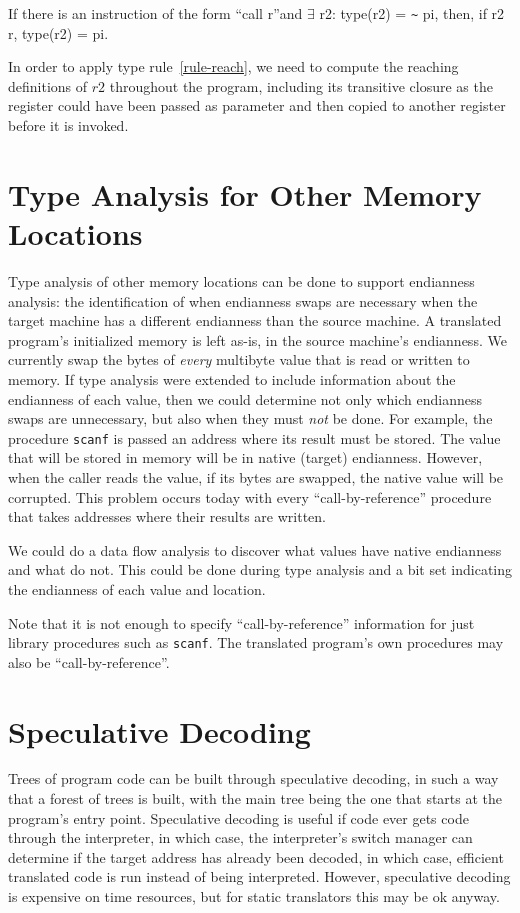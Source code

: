 \begin{typerule}
If there is an instruction of the form ``call r''and $\exists$ r2: 
type(r2) = \verb!~! pi, then, if r2 \ra* r, type(r2) = pi. 
\label{rule-reach}
\end{typerule}

In order to apply type rule~\ref{rule-reach}, we need to compute
the reaching definitions of $r2$ throughout the program, including
its transitive closure as the register could have been passed 
as parameter and then copied to another register before it is 
invoked. 


\section{Type Analysis for Other Memory Locations}
Type analysis of other memory locations
can be done to support endianness analysis:
the identification of when endianness swaps are necessary
when the target machine has a different endianness than the source machine.
A translated program's initialized memory is left as-is,
in the source machine's endianness.
We currently swap the bytes of \emph{every} multibyte value
that is read or written to memory.
If type analysis were extended
to include information about the endianness of each value,
then we could determine not only which endianness swaps are unnecessary,
but also when they must \emph{not} be done.
For example, the procedure \texttt{scanf}
is passed an address where its result must be stored.
The value that will be stored in memory
will be in native (target) endianness.
However, when the caller reads the value,
if its bytes are swapped, the native value will be corrupted.
This problem occurs today with every ``call-by-reference'' procedure
that takes addresses where their results are written.

We could do a data flow analysis to discover what values
have native endianness and what do not.
This could be done during type analysis
and a bit set indicating the endianness of each value and location.

Note that it is not enough to specify ``call-by-reference'' information
for just library procedures such as \texttt{scanf}.
The translated program's own procedures
may also be ``call-by-reference''. 


\section{Speculative Decoding}
Trees of program code can be built through speculative 
decoding, in such a way that a forest of trees is built, 
with the main tree being the one that starts at the 
program's entry point.  
Speculative decoding is useful if code ever gets code 
through the interpreter, in which case, the interpreter's 
switch manager can determine if the target address has
already been decoded, in which case, efficient translated
code is run instead of being interpreted.  However, 
speculative decoding is expensive on time resources, 
but for static translators this may be ok anyway.  
 
